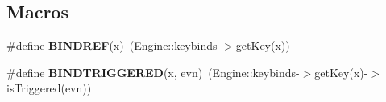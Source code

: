 \subsection*{Macros}
\begin{DoxyCompactItemize}
\item 
\#define {\bfseries B\+I\+N\+D\+R\+EF}(x)~(Engine\+::keybinds-\/$>$get\+Key(x))\hypertarget{Keybinds_8hh_aa97e65a268c7b74ecb84e324ee948be2}{}\label{Keybinds_8hh_aa97e65a268c7b74ecb84e324ee948be2}

\item 
\#define {\bfseries B\+I\+N\+D\+T\+R\+I\+G\+G\+E\+R\+ED}(x,  evn)~(Engine\+::keybinds-\/$>$get\+Key(x)-\/$>$is\+Triggered(evn))\hypertarget{Keybinds_8hh_a20735dc5e19dc878fa8b684e85042adb}{}\label{Keybinds_8hh_a20735dc5e19dc878fa8b684e85042adb}

\end{DoxyCompactItemize}
